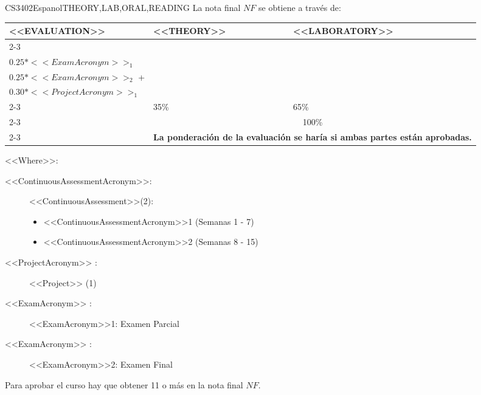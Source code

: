  
  \begin{evaluation}{CS3402}{Espanol}{THEORY,LAB,ORAL,READING}
  La nota final $NF$ se obtiene a través de:

  \begin{tabularx}{0.9\textwidth}{|X|p{}|p{}|} \hline
  \multirow{4}{*}{\uppercase{<<Evaluation>>}} & \uppercase{<<Theory>>} & \uppercase{<<Laboratory>>} \\ \cline{2-3}
  & %
      \begin{minipage}{0.95\textwidth}
      \begin{tabular}{l}
        $0.10*<<ContinuousAssessmentAcronym>>_{1}$  + \\
        $0.25*<<ExamAcronym>>_{1}$ 
      \end{tabular} 
      \end{minipage} 
  & %
      \begin{minipage}{0.95\textwidth}
      \begin{tabular}{l}
        $0.10*<<ContinuousAssessmentAcronym>>_{2}$  + \\
        $0.25*<<ExamAcronym>>_{2}$  +  \\
        $0.30*<<ProjectAcronym>>_{1}$
      \end{tabular} 
      \end{minipage}                 \\ \cline{2-3}
  
  & %
  35\% 
  & %
  65\% \\ \cline{2-3}
  & \multicolumn{2}{c|}{100\%}  \\ \cline{2-3}
  & \multicolumn{2}{c|}{\textbf{La ponderación de la evaluación se haría si ambas partes están aprobadas.}}  \\ \hline
  \end{tabularx}
    
  \vspace{2mm}
  \noindent <<Where>>:
  \begin{description}
      \item[<<ContinuousAssessmentAcronym>>:]<<ContinuousAssessment>>(2):
      \begin{itemize}
              \item <<ContinuousAssessmentAcronym>>1 (Semanas 1 - 7) 
              \item <<ContinuousAssessmentAcronym>>2 (Semanas 8 - 15)
      \end{itemize}
      \item[<<ProjectAcronym>> :] <<Project>> (1)
      \item[<<ExamAcronym>> :] <<ExamAcronym>>1: Examen Parcial
      \item[<<ExamAcronym>> :] <<ExamAcronym>>2: Examen Final
  \end{description}

  \noindent Para aprobar el curso hay que obtener 11 o más en la nota final $NF$.
  \end{evaluation}
 
